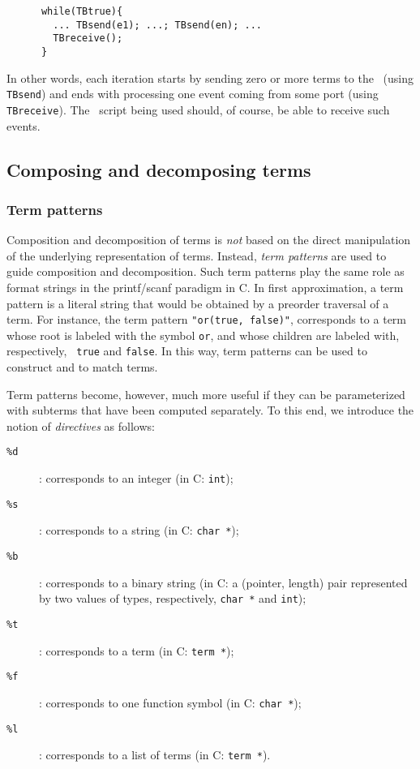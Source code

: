 \documentclass[a4,twoside,noweb]{article} %
\begin{document}
\begin{verbatim}
      while(TBtrue){
        ... TBsend(e1); ...; TBsend(en); ...
        TBreceive();
      }
\end{verbatim}

In other words, each iteration starts by sending zero or more terms
to the \TB\ (using {\tt TBsend}) and ends with processing one event
coming from some port (using {\tt TBreceive}).  The \T\ script being used
should, of course, be able to receive such events.


\subsection{\label{Compose}Composing and decomposing terms}

\subsubsection{\label{Patterns}Term patterns}
Composition and decomposition of terms is {\em not} based on the
direct manipulation of the underlying representation of terms.
Instead, {\em term patterns} are used to guide composition and
decomposition.  Such term patterns play the same role as format
strings in the printf/scanf paradigm in C.  In first approximation, a
term pattern is a literal string that would be obtained by a preorder
traversal of a term.  For instance, the term pattern {\tt "or(true,
false)"}, corresponds to a term whose root is labeled with the symbol
{\tt or}, and whose children are labeled with, respectively, {\tt
true} and {\tt false}. In this way, term patterns can be used to
construct and to match terms.

Term patterns become, however, much more useful if they can be parameterized
with subterms that have been computed separately.
To this end, we introduce the notion of {\em directives} as follows:

\begin{description}
\item[{\tt \%d}]: corresponds to an integer (in C: {\tt int});
\item[{\tt \%s}]: corresponds to a string (in C: {\tt char *});
\item[{\tt \%b}]: corresponds to a binary string (in C: a (pointer, length) pair 
represented by two values of types, respectively, {\tt char *} and {\tt int});
\item[{\tt \%t}]: corresponds to a term (in C: {\tt term *});
\item[{\tt \%f}]: corresponds to one function symbol (in C: {\tt char *});
\item[{\tt \%l}]: corresponds to a list of terms (in C: {\tt term *}).
\end{description}
\end{document}
